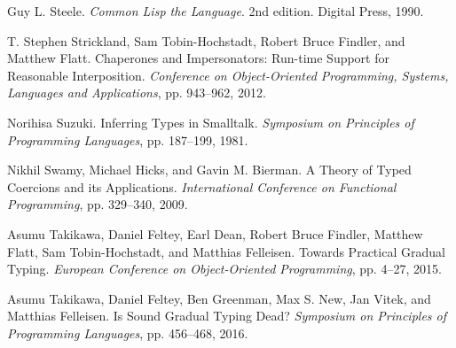 \documentclass[screen=true, 10pt, acmsmall]{acmart}
\newenvironment{SingleColumn}{\begin{list}{}{\topsep=0pt\partopsep=0pt%
\listparindent=0pt\itemindent=0pt\labelwidth=0pt\leftmargin=0pt\rightmargin=0pt%
\itemsep=0pt\parsep=0pt}\item}{\end{list}}
\newenvironment{AutoBibliography}{\begin{small}}{\end{small}}
\newcommand{\Autobibentry}[1]{\hspace{0.05\linewidth}\parbox[t]{0.95\linewidth}{\parindent=-0.05\linewidth#1\vspace{1.0ex}}}
\begin{document}
\begin{AutoBibliography}
\begin{SingleColumn}
\label{t:x28autobib_x22Guy_Lx2e_SteeleCommon_Lisp_the_Language2nd_editionx2e_Digital_Press1990x22x29}\Autobibentry{Guy L. Steele. \textit{Common Lisp the Language}. 2nd edition. Digital Press, 1990.}

\label{t:x28autobib_x22Tx2e_Stephen_Stricklandx2c_Sam_Tobinx2dHochstadtx2c_Robert_Bruce_Findlerx2c_and_Matthew_FlattChaperones_and_Impersonatorsx3a_Runx2dtime_Support_for_Reasonable_InterpositionConference_on_Objectx2dOriented_Programmingx2c_Systemsx2c_Languages_and_Applicationsx2c_ppx2e_943x2dx2d9622012x22x29}\Autobibentry{T. Stephen Strickland, Sam Tobin{-}Hochstadt, Robert Bruce Findler, and Matthew Flatt. Chaperones and Impersonators: Run{-}time Support for Reasonable Interposition. \textit{Conference on Object{-}Oriented Programming, Systems, Languages and Applications}, pp. 943{--}962, 2012.}

\label{t:x28autobib_x22Norihisa_SuzukiInferring_Types_in_SmalltalkSymposium_on_Principles_of_Programming_Languagesx2c_ppx2e_187x2dx2d1991981x22x29}\Autobibentry{Norihisa Suzuki. Inferring Types in Smalltalk. \textit{Symposium on Principles of Programming Languages}, pp. 187{--}199, 1981.}

\label{t:x28autobib_x22Nikhil_Swamyx2c_Michael_Hicksx2c_and_Gavin_Mx2e_BiermanA_Theory_of_Typed_Coercions_and_its_ApplicationsInternational_Conference_on_Functional_Programmingx2c_ppx2e_329x2dx2d3402009x22x29}\Autobibentry{Nikhil Swamy, Michael Hicks, and Gavin M. Bierman. A Theory of Typed Coercions and its Applications. \textit{International Conference on Functional Programming}, pp. 329{--}340, 2009.}

\label{t:x28autobib_x22Asumu_Takikawax2c_Daniel_Felteyx2c_Earl_Deanx2c_Robert_Bruce_Findlerx2c_Matthew_Flattx2c_Sam_Tobinx2dHochstadtx2c_and_Matthias_FelleisenTowards_Practical_Gradual_TypingEuropean_Conference_on_Objectx2dOriented_Programmingx2c_ppx2e_4x2dx2d272015x22x29}\Autobibentry{Asumu Takikawa, Daniel Feltey, Earl Dean, Robert Bruce Findler, Matthew Flatt, Sam Tobin{-}Hochstadt, and Matthias Felleisen. Towards Practical Gradual Typing. \textit{European Conference on Object{-}Oriented Programming}, pp. 4{--}27, 2015.}

\label{t:x28autobib_x22Asumu_Takikawax2c_Daniel_Felteyx2c_Ben_Greenmanx2c_Max_Sx2e_Newx2c_Jan_Vitekx2c_and_Matthias_FelleisenIs_Sound_Gradual_Typing_Deadx3fSymposium_on_Principles_of_Programming_Languagesx2c_ppx2e_456x2dx2d4682016x22x29}\Autobibentry{Asumu Takikawa, Daniel Feltey, Ben Greenman, Max S. New, Jan Vitek, and Matthias Felleisen. Is Sound Gradual Typing Dead? \textit{Symposium on Principles of Programming Languages}, pp. 456{--}468, 2016.}


\end{SingleColumn}
\end{AutoBibliography}
\end{document}
